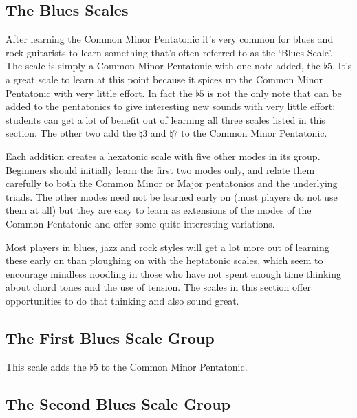 \documentclass[english]{./gbook}
\begin{document}
\begin{large}

\section{The Blues Scales}

After learning the Common Minor Pentatonic it's very common for blues and rock guitarists to learn something that's often referred to as the `Blues Scale'. The scale is simply a Common Minor Pentatonic with one note added, the $\flat5$. It's a great scale to learn at this point because it spices up the Common Minor Pentatonic with very little effort. In fact the $\flat5$ is not the only note that can be added to the pentatonics to give interesting new sounds with very little effort: students can get a lot of benefit out of learning all three scales listed in this section. The other two add the $\natural 3$ and $\natural 7$ to the Common Minor Pentatonic. 

Each addition creates a hexatonic scale with five other modes in its group. Beginners should initially learn the first two modes only, and relate them carefully to both the Common Minor or Major pentatonics and the underlying triads. The other modes need not be learned early on (most players do not use them at all) but they are easy to learn as extensions of the modes of the Common Pentatonic and offer some quite interesting variations. 

Most players in blues, jazz and rock styles will get a lot more out of learning these early on than ploughing on with the heptatonic scales, which seem to encourage mindless noodling in those who have not spent enough time thinking about chord tones and the use of tension. The scales in this section offer opportunities to do that thinking and also sound great.

\subsection*{The First Blues Scale Group}

This scale adds the $\flat 5$ to the Common Minor Pentatonic.


\subsection*{The Second Blues Scale Group}


\end{large}
\end{document}
